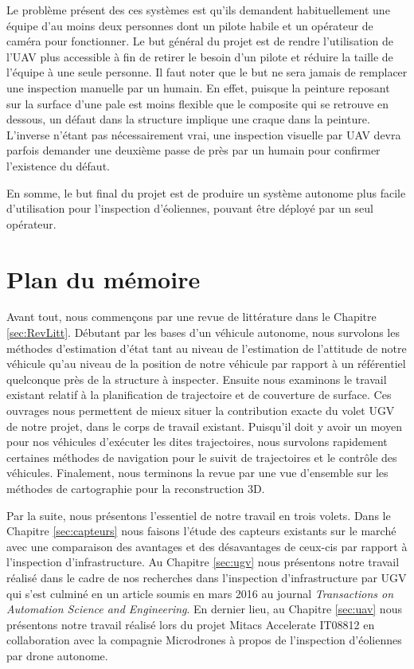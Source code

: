 Le problème présent des ces systèmes est qu'ils demandent habituellement une équipe d'au moins deux personnes dont un pilote habile et un opérateur de caméra pour fonctionner. Le but général du projet est de rendre l'utilisation de l'UAV plus accessible à fin de retirer le besoin d'un pilote et réduire la taille de l'équipe à une seule personne. Il faut noter que le but ne sera jamais de remplacer une inspection manuelle par un humain. En effet, puisque la peinture reposant sur la surface d'une pale est moins flexible que le composite qui se retrouve en dessous, un défaut dans la structure implique une craque dans la peinture. L'inverse n'étant pas nécessairement vrai, une inspection visuelle par UAV devra parfois demander une deuxième passe de près par un humain pour confirmer l'existence du défaut.

En somme, le but final du projet est de produire un système autonome plus facile d'utilisation pour l'inspection d'éoliennes, pouvant être déployé par un seul opérateur.

\section{Plan du mémoire}

Avant tout, nous commençons par une revue de littérature dans le Chapitre \ref{sec:RevLitt}. Débutant par les bases d'un véhicule autonome, nous survolons les méthodes d'estimation d'état tant au niveau de l'estimation de l'attitude de notre véhicule qu'au niveau de la position de notre véhicule par rapport à un référentiel quelconque près de la structure à inspecter. Ensuite nous examinons le travail existant relatif à la planification de trajectoire et de couverture de surface. Ces ouvrages nous permettent de mieux situer la contribution exacte du volet UGV de notre projet, dans le corps de travail existant. Puisqu'il doit y avoir un moyen pour nos véhicules d'exécuter les dites trajectoires, nous survolons rapidement certaines méthodes de navigation pour le suivit de trajectoires et le contrôle des véhicules. Finalement, nous terminons la revue par une vue d'ensemble sur les méthodes de cartographie pour la reconstruction 3D.

Par la suite, nous présentons l'essentiel de notre travail en trois volets. Dans le Chapitre \ref{sec:capteurs} nous faisons l'étude des capteurs existants sur le marché avec une comparaison des avantages et des désavantages de ceux-cis par rapport à l'inspection d'infrastructure. Au Chapitre \ref{sec:ugv} nous présentons notre travail réalisé dans le cadre de nos recherches dans l'inspection d'infrastructure par UGV qui s'est culminé en un article soumis en mars 2016 au journal \textit{Transactions on Automation Science and Engineering}. En dernier lieu, au Chapitre \ref{sec:uav} nous présentons notre travail réalisé lors du projet Mitacs Accelerate IT08812 en collaboration avec la compagnie Microdrones à propos de l'inspection d'éoliennes par drone autonome.

